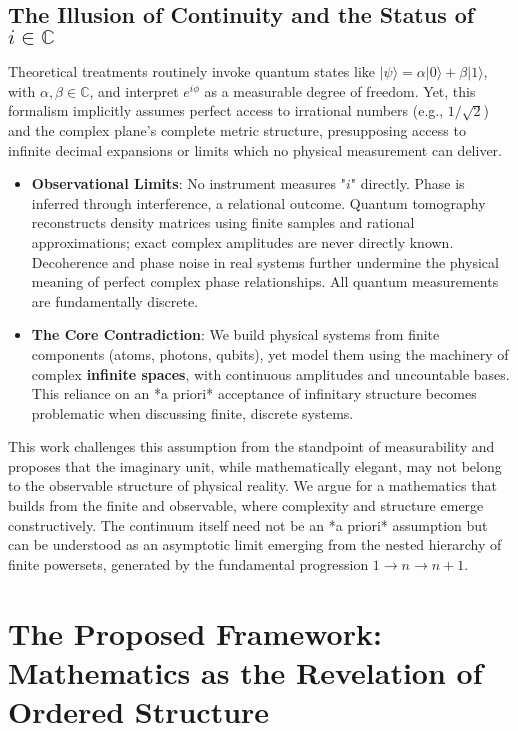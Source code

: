 \documentclass[11pt,a4paper]{article}
\begin{document}
\subsection*{The Illusion of Continuity and the Status of $i \in \mathbb{C}$}

Theoretical treatments routinely invoke quantum states like $|\psi\rangle = \alpha|0\rangle + \beta|1\rangle$, with $\alpha, \beta \in \mathbb{C}$, and interpret $e^{i\phi}$ as a measurable degree of freedom. Yet, this formalism implicitly assumes perfect access to irrational numbers (e.g., $1/\sqrt{2}$) and the complex plane's complete metric structure, presupposing access to infinite decimal expansions or limits which no physical measurement can deliver.

\begin{itemize}
    \item \textbf{Observational Limits}: No instrument measures "$i$" directly. Phase is inferred through interference, a relational outcome. Quantum tomography reconstructs density matrices using finite samples and rational approximations; exact complex amplitudes are never directly known. Decoherence and phase noise in real systems further undermine the physical meaning of perfect complex phase relationships. All quantum measurements are fundamentally discrete.
    \item \textbf{The Core Contradiction}: We build physical systems from finite components (atoms, photons, qubits), yet model them using the machinery of complex \textbf{infinite spaces}, with continuous amplitudes and uncountable bases. This reliance on an *a priori* acceptance of infinitary structure becomes problematic when discussing finite, discrete systems.
\end{itemize}

This work challenges this assumption from the standpoint of measurability and proposes that the imaginary unit, while mathematically elegant, may not belong to the observable structure of physical reality. We argue for a mathematics that builds from the finite and observable, where complexity and structure emerge constructively. The continuum itself need not be an *a priori* assumption but can be understood as an asymptotic limit emerging from the nested hierarchy of finite powersets, generated by the fundamental progression $1 \to n \to n+1$.

\section{The Proposed Framework: Mathematics as the Revelation of Ordered Structure}
\end{document}
